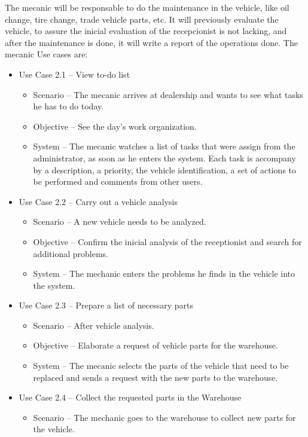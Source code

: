   The mecanic will be responsable to do the maintenance in the vehicle, like oil change, tire change, trade vehicle parts, etc. 
  It will previously evaluate the vehicle, to assure the inicial evaluation of the recepcionist is not lacking, and after the maintenance is done, it will write a report of the operations done. 
  The mecanic Use cases are:

  \begin{itemize}
    \item Use Case 2.1 – View to-do list
    \begin{itemize}
      \item Scenario – The mecanic arrives at dealership and wants to see what tasks he has to do today.
      \item Objective – See the day's work organization.
      \item System – The mecanic watches a list of tasks that were assign from the administrator, as soon as he enters the system. Each task is accompany by a description, a priority, the vehicle identification, a set of actions to be performed and comments from other users. 
    \end{itemize}
    \item Use Case 2.2 – Carry out a vehicle analysis 
    \begin{itemize}
      \item Scenario – A new vehicle needs to be analyzed.
      \item Objective – Confirm the inicial analysis of the receptionist and search for additional problems.
      \item System – The mechanic enters the problems he finds in the vehicle into the system. 
    \end{itemize}
    \item Use Case 2.3 – Prepare a list of necessary parts
    \begin{itemize}
      \item Scenario – After vehicle analysis.
      \item Objective – Elaborate a request of vehicle parts for the warehouse.
      \item System – The mecanic selects the parts of the vehicle that need to be replaced and sends a request with the new parts to the warehouse.
    \end{itemize}
    \item Use Case 2.4 – Collect the requested parts in the Warehouse
    \begin{itemize}
      \item Scenario – The mechanic goes to the warehouse to collect new parts for the vehicle.

\end{itemize}
\end{itemize}
